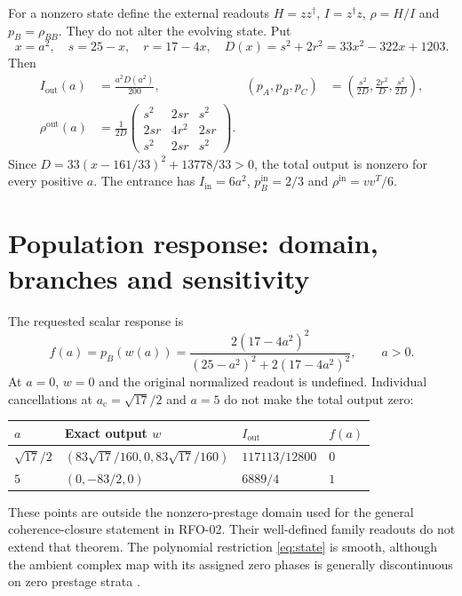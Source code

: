\documentclass[11pt,a4paper]{article}
\newcommand{\Iout}{I_{\mathrm{out}}}
\newcommand{\Iin}{I_{\mathrm{in}}}
\newcommand{\rout}{\rho^{\mathrm{out}}}
\newcommand{\ac}{a_{\mathrm c}}
\begin{document}
For a nonzero state define the external readouts $H=zz^\dagger$, $I=z^\dagger z$, $\rho=H/I$ and $p_B=\rho_{BB}$. They do not alter the evolving state. Put
\begin{equation}
x=a^2,\quad s=25-x,\quad r=17-4x,\quad
D(x)=s^2+2r^2=33x^2-322x+1203.\label{eq:coordinates}
\end{equation}
Then
\begin{align}
\Iout(a)&=\frac{a^2D(a^2)}{200},&
(p_A,p_B,p_C)&=\left(\frac{s^2}{2D},\frac{2r^2}{D},\frac{s^2}{2D}\right),\label{eq:readouts}\\
\rout(a)&=\frac1{2D}\begin{pmatrix}s^2&2sr&s^2\\2sr&4r^2&2sr\\s^2&2sr&s^2\end{pmatrix}.\label{eq:rho}
\end{align}
Since $D=33(x-161/33)^2+13778/33>0$, the total output is nonzero for every positive $a$. The entrance has $\Iin=6a^2$, $p_B^{\mathrm{in}}=2/3$ and $\rho^{\mathrm{in}}=vv^T/6$.

\clearpage
\section{Population response: domain, branches and sensitivity}\label{sec:population}
The requested scalar response is
\begin{equation}
\boxed{f(a)=p_B(w(a))=\frac{2(17-4a^2)^2}{(25-a^2)^2+2(17-4a^2)^2}},\qquad a>0.\label{eq:f}
\end{equation}
At $a=0$, $w=0$ and the original normalized readout is undefined. Individual cancellations at $\ac=\sqrt{17}/2$ and $a=5$ do not make the total output zero:
\begin{center}
\begin{tabular}{@{}llll@{}}
\toprule
$a$ & Exact output $w$ & $\Iout$ & $f(a)$\\\midrule
$\sqrt{17}/2$ & $(83\sqrt{17}/160,0,83\sqrt{17}/160)$ & $117113/12800$ & $0$\\[3pt]
$5$ & $(0,-83/2,0)$ & $6889/4$ & $1$\\\bottomrule
\end{tabular}
\end{center}
These points are outside the nonzero-prestage domain used for the general coherence-closure statement in RFO-02. Their well-defined family readouts do not extend that theorem. The polynomial restriction \eqref{eq:state} is smooth, although the ambient complex map with its assigned zero phases is generally discontinuous on zero prestage strata \cite{paperA}.
\end{document}
